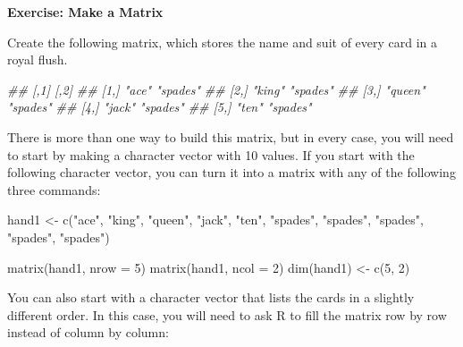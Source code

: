 \documentclass[
  letterpaper,
  DIV=11,
  numbers=noendperiod]{scrbook}
\newenvironment{Shaded}{\begin{snugshade}}{\end{snugshade}}
\newcommand{\AttributeTok}[1]{\textcolor[rgb]{0.40,0.45,0.13}{#1}}
\newcommand{\DecValTok}[1]{\textcolor[rgb]{0.68,0.00,0.00}{#1}}
\newcommand{\DocumentationTok}[1]{\textcolor[rgb]{0.37,0.37,0.37}{\textit{#1}}}
\newcommand{\FunctionTok}[1]{\textcolor[rgb]{0.28,0.35,0.67}{#1}}
\newcommand{\NormalTok}[1]{\textcolor[rgb]{0.00,0.23,0.31}{#1}}
\newcommand{\OtherTok}[1]{\textcolor[rgb]{0.00,0.23,0.31}{#1}}
\newcommand{\StringTok}[1]{\textcolor[rgb]{0.13,0.47,0.30}{#1}}
\begin{document}
\begin{tcolorbox}[enhanced jigsaw, left=2mm, breakable, colback=white, colframe=quarto-callout-color-frame, leftrule=.75mm, bottomrule=.15mm, arc=.35mm, opacityback=0, rightrule=.15mm, toprule=.15mm]

\vspace{-3mm}\textbf{Exercise: Make a Matrix}\vspace{3mm}

Create the following matrix, which stores the name and suit of every
card in a royal flush.

\end{tcolorbox}

\begin{Shaded}
\begin{Highlighting}[]
\DocumentationTok{\#\#      [,1]    [,2]    }
\DocumentationTok{\#\# [1,] "ace"   "spades"}
\DocumentationTok{\#\# [2,] "king"  "spades"}
\DocumentationTok{\#\# [3,] "queen" "spades"}
\DocumentationTok{\#\# [4,] "jack"  "spades"}
\DocumentationTok{\#\# [5,] "ten"   "spades"}
\end{Highlighting}
\end{Shaded}

There is more than one way to build this matrix, but in every case, you
will need to start by making a character vector with 10 values. If you
start with the following character vector, you can turn it into a matrix
with any of the following three commands:

\begin{Shaded}
\begin{Highlighting}[]
\NormalTok{hand1 }\OtherTok{\textless{}{-}} \FunctionTok{c}\NormalTok{(}\StringTok{"ace"}\NormalTok{, }\StringTok{"king"}\NormalTok{, }\StringTok{"queen"}\NormalTok{, }\StringTok{"jack"}\NormalTok{, }\StringTok{"ten"}\NormalTok{, }\StringTok{"spades"}\NormalTok{, }\StringTok{"spades"}\NormalTok{, }
  \StringTok{"spades"}\NormalTok{, }\StringTok{"spades"}\NormalTok{, }\StringTok{"spades"}\NormalTok{)}

\FunctionTok{matrix}\NormalTok{(hand1, }\AttributeTok{nrow =} \DecValTok{5}\NormalTok{)}
\FunctionTok{matrix}\NormalTok{(hand1, }\AttributeTok{ncol =} \DecValTok{2}\NormalTok{)}
\FunctionTok{dim}\NormalTok{(hand1) }\OtherTok{\textless{}{-}} \FunctionTok{c}\NormalTok{(}\DecValTok{5}\NormalTok{, }\DecValTok{2}\NormalTok{)}
\end{Highlighting}
\end{Shaded}

You can also start with a character vector that lists the cards in a
slightly different order. In this case, you will need to ask R to fill
the matrix row by row instead of column by column:
\end{document}
